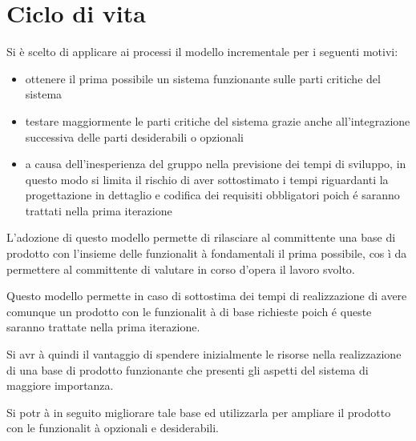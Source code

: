 \section{Ciclo di vita}{

Si \`{e} scelto di applicare ai processi il modello incrementale per i seguenti motivi:

\begin{itemize}

\item ottenere il prima possibile un sistema funzionante sulle parti critiche del sistema

\item testare maggiormente le parti critiche del sistema grazie anche all'integrazione successiva delle parti desiderabili o opzionali

\item a causa dell'inesperienza del gruppo nella previsione dei tempi di sviluppo, in questo modo si limita il rischio di aver sottostimato i tempi riguardanti la progettazione in dettaglio e codifica dei requisiti obbligatori poich \'{e} saranno trattati nella prima iterazione

\end{itemize}

L'adozione di questo modello permette di rilasciare al committente una base di prodotto con l'insieme delle funzionalit \`{a} fondamentali il prima possibile, cos \`{i} da permettere al committente di valutare in corso d'opera il lavoro svolto. 

Questo modello permette in caso di sottostima dei tempi di realizzazione di avere comunque un prodotto con le funzionalit \`{a} di base richieste poich \'{e} queste saranno trattate nella prima iterazione.

Si avr \`{a} quindi il vantaggio di spendere inizialmente le risorse nella realizzazione di una base di prodotto funzionante che presenti gli aspetti del sistema di maggiore importanza. 

Si potr \`{a} in seguito migliorare tale base ed utilizzarla per ampliare il prodotto con le funzionalit \`{a} opzionali e desiderabili.
}



